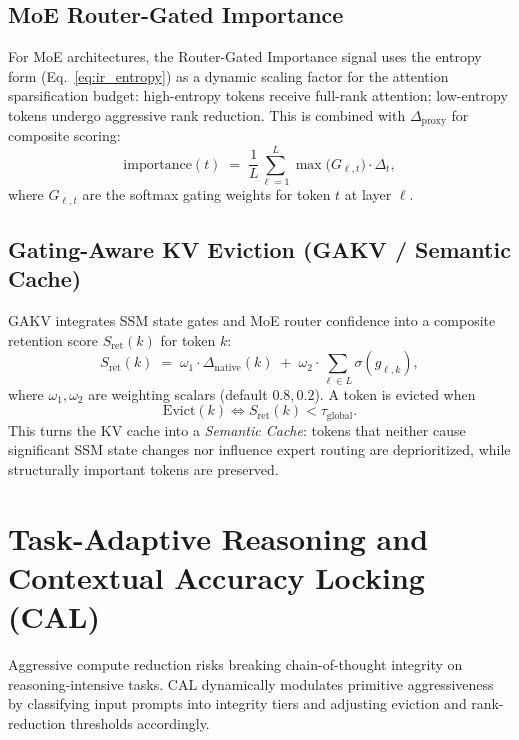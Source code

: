 \documentclass[11pt]{article}
\newcommand{\dsig}{\Delta}
\newcommand{\proxydsig}{\ensuremath{\dsig_{\mathrm{proxy}}}}
\begin{document}
\subsection{MoE Router-Gated Importance}
For MoE architectures, the Router-Gated Importance signal uses the entropy
form (Eq.~\ref{eq:ir_entropy}) as a dynamic scaling factor for the attention
sparsification budget: high-entropy tokens receive full-rank attention;
low-entropy tokens undergo aggressive rank reduction. This is combined with
$\proxydsig$ for composite scoring:
\begin{equation}\label{eq:moe_importance}
  \mathrm{importance}(t) \;=\; \frac{1}{L} \sum_{\ell=1}^{L} \max\!\bigl(G_{\ell,t}\bigr) \cdot \dsig_t,
\end{equation}
where $G_{\ell,t}$ are the softmax gating weights for token $t$ at layer $\ell$.

\subsection{Gating-Aware KV Eviction (GAKV / Semantic Cache)}
\label{sec:gakv}
GAKV integrates SSM state gates and MoE router confidence into a composite
retention score $S_{\mathrm{ret}}(k)$ for token $k$:
\begin{equation}\label{eq:gakv_score}
  S_{\mathrm{ret}}(k) \;=\; \omega_1 \cdot \dsig_{\mathrm{native}}(k) \;+\; \omega_2 \cdot \sum_{\ell \in L} \sigma(g_{\ell,k}),
\end{equation}
where $\omega_1, \omega_2$ are weighting scalars (default $0.8, 0.2$). A
token is evicted when
\begin{equation}\label{eq:gakv_evict}
  \mathrm{Evict}(k) \Leftrightarrow S_{\mathrm{ret}}(k) < \tau_{\mathrm{global}}.
\end{equation}
This turns the KV cache into a \emph{Semantic Cache}: tokens that neither
cause significant SSM state changes nor influence expert routing are
deprioritized, while structurally important tokens are preserved.

\section{Task-Adaptive Reasoning and Contextual Accuracy Locking (CAL)}
\label{sec:cal}
Aggressive compute reduction risks breaking chain-of-thought integrity on
reasoning-intensive tasks. CAL dynamically modulates primitive aggressiveness
by classifying input prompts into integrity tiers and adjusting eviction and
rank-reduction thresholds accordingly.
\end{document}
